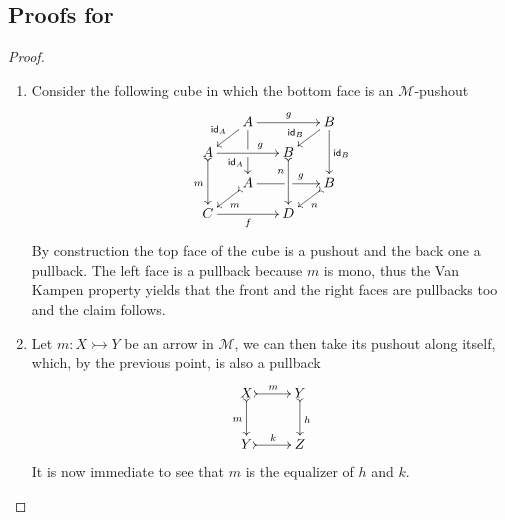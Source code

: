 \documentclass[a4paper,UKenglish,cleveref,pdftex,amsthm,thm-restate,numberwithinsect]{cas-sc}
\theoremstyle{plain}
\theoremstyle{definition}
\def\C{\textbf {\textup{C}}}
\newcommand{\mto}{\rightarrowtail}
\newcommand{\id}[1]{\mathsf{id}_{#1}}
\begin{document}
\subsection{Proofs for }\label{app:primo}

\regmono*
\begin{proof}\label{regmono-proof}
	\begin{enumerate}
		\item  Consider the following cube in which the bottom face is an $\mathcal{M}$-pushout
		\[\xymatrix@C=15pt@R=9pt{&A\ar[dd]|\hole_(.65){\id{A}}\ar[rr]^{g} \ar[dl]_{\id{A}} && B \ar[dd]^{\id{B}} \ar[dl]_(.6){\id{B}} \\ A  \ar@{>->}[dd]_{m}\ar[rr]^(.65){g} & & B \ar@{>->}[dd]_(.3){n}\\&A\ar[rr]|\hole^(.65){g} \ar@{>->}[dl]^{m} && B \ar@{>->}[dl]^{n} \\C \ar[rr]_{f} & & D}\]
		By construction the top face of the cube is a pushout and the back one a pullback. The left face is a pullback because $m$ is mono, thus the Van Kampen property yields that the front and the right faces are pullbacks too and the claim follows.
		\item Let $m\colon X\mto Y$ be an arrow in $\mathcal{M}$, we can then take its pushout along itself, which, by the previous point, is also a pullback
		\[\xymatrix{X \ar@{>->}[r]^{m} \ar@{>->}[d]_{m}& Y \ar@{>->}[d]^{h}\\ Y \ar@{>->}[r]^{k} & Z}\]
		It is now immediate to see that $m$ is the equalizer of $h$ and $k$.   \qedhere
	\end{enumerate}
\end{proof}
\end{document}
